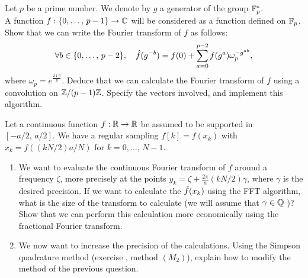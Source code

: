  
\begin{exo}
\label{exo-chirp-transform-finis-corps}
 
  Let $ p $ be a prime number. We denote by $ g $ a generator of the group $ \mathbb{F}_p^* $. \\A function $ f: \{0, \ldots, \, p-1 \} \rightarrow \mathbb{C} $ will be considered as a function defined on $ \mathbb{F}_p $. Show that we can write the Fourier transform of $ f $ as follows:
\begin{equation*}
\forall b \in \{0, \ldots, \, p-2 \}, \quad \hat{f} (g^{- b}) = f(0) + \sum_{a = 0}^{p-2}{f(g^a) \omega_p^{-g^{ab}}},
\end{equation*}
where $ \omega_p = e^{\frac{2 \imath \pi}{p}} $. Deduce that we can calculate the Fourier transform of $ f $ using a convolution on $ \mathbb{Z}/(p-1) \mathbb{Z} $. Specify the vectors involved, and implement this algorithm.
\end{exo}
 
 
\begin{exo}
\label{exo-calcul-approaches-transfo-frac}
 
   Let a continuous function $ f: \mathbb{R} \rightarrow \mathbb{R} $ be assumed to be supported in $ [- a / 2, \, a / 2] $. We have a regular sampling $ f [k] = f(x_k) $ with $ x_k = f((kN / 2) a / N) $ for $ k = 0, \ldots, \, N-1 $. \begin{enumerate}
\item We want to evaluate the continuous Fourier transform of $ f $ around a frequency $ \zeta $, more precisely at the points $ y_k = \zeta + \frac{2 \pi}{a} (kN / 2) \gamma $, where $ \gamma $ is the desired precision. If we want to calculate the $ \hat{f} (x_k) $ using the FFT algorithm, what is the size of the transform to calculate (we will assume that $ \gamma \in \mathbb{Q} $ )? Show that we can perform this calculation more economically using the fractional Fourier transform.
\item {} We now want to increase the precision of the calculations. Using the Simpson quadrature method (exercise , method $ (M_2) $), explain how to modify the method of the previous question.
\end{enumerate}
\end{exo}
 
